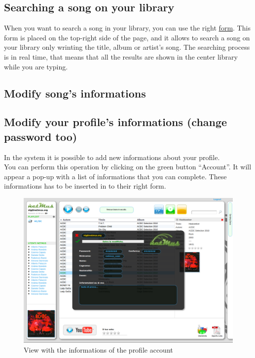\subsection*{Searching a song on your library}

When you want to search a song in your library, you can use the right \underline{form}. This
form is placed on the top-right side of the page, and it allows to search a song
on your library only wrinting the title, album or artist's song. The searching
process is in real time, that means that all the results are shown in the center
library while you are typing.


\subsection*{Modify song's informations}

\subsection*{Modify your profile's informations (change password too)}

In the  system it is possible to add new informations about your
profile.\\
You can perform this operation by clicking on the green button ``Account''. It
will appear a pop-up with a list of informations that you can complete. These
informations has to be inserted in to their right form.

\begin{figure}[htbp]
  \centering
  \includegraphics[width=15cm]{img/MU/profile_view.png}
\caption{View with the informations of the profile account}
\end{figure}

